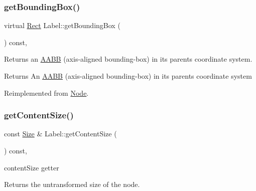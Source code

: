 \mbox{\label{classLabel_a0b586d58df89f97fca24231c794335ca}} 
\subsubsection{\texorpdfstring{get\+Bounding\+Box()}{getBoundingBox()}\hspace{0.1cm}{\footnotesize\ttfamily [2/2]}}
{\footnotesize\ttfamily virtual \hyperlink{classRect}{Rect} Label\+::get\+Bounding\+Box (\begin{DoxyParamCaption}{ }\end{DoxyParamCaption}) const\hspace{0.3cm}{\ttfamily [override]}, {\ttfamily [virtual]}}

Returns an \hyperlink{classAABB}{A\+A\+BB} (axis-\/aligned bounding-\/box) in its parent\textquotesingle{}s coordinate system.

\begin{DoxyReturn}{Returns}
An \hyperlink{classAABB}{A\+A\+BB} (axis-\/aligned bounding-\/box) in its parent\textquotesingle{}s coordinate system 
\end{DoxyReturn}


Reimplemented from \hyperlink{classNode_a7b3849315467fdb992b273fbd3b3fc66}{Node}.

\mbox{\label{classLabel_a3b571f804249bde9c8d8a5b4bb067d3f}} 
\subsubsection{\texorpdfstring{get\+Content\+Size()}{getContentSize()}\hspace{0.1cm}{\footnotesize\ttfamily [1/2]}}
{\footnotesize\ttfamily const \hyperlink{classSize}{Size} \& Label\+::get\+Content\+Size (\begin{DoxyParamCaption}{ }\end{DoxyParamCaption}) const\hspace{0.3cm}{\ttfamily [override]}, {\ttfamily [virtual]}}



content\+Size getter 

Returns the untransformed size of the node.

